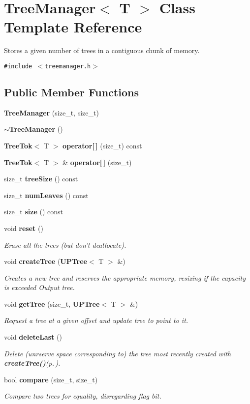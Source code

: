 \section{Tree\-Manager$<$ T $>$ Class Template Reference}
\label{classTreeManager}
Stores a given number of trees in a contiguous chunk of memory.  


{\tt \#include $<$treemanager.h$>$}

\subsection*{Public Member Functions}
\begin{CompactItemize}
\item 
{\bf Tree\-Manager} (size\_\-t, size\_\-t)
\item 
{\bf $\sim$Tree\-Manager} ()
\item 
{\bf Tree\-Tok}$<$ T $>$ {\bf operator[$\,$]} (size\_\-t) const 
\item 
{\bf Tree\-Tok}$<$ T $>$ \& {\bf operator[$\,$]} (size\_\-t)
\item 
size\_\-t {\bf tree\-Size} () const 
\item 
size\_\-t {\bf num\-Leaves} () const 
\item 
size\_\-t {\bf size} () const 
\item 
void {\bf reset} ()
\begin{CompactList}\small\item\em Erase all the trees (but don't deallocate). \item\end{CompactList}\item 
void {\bf create\-Tree} ({\bf UPTree}$<$ T $>$ \&)
\begin{CompactList}\small\item\em Creates a new tree and reserves the appropriate memory, resizing if the capacity is exceeded  Output tree. \item\end{CompactList}\item 
void {\bf get\-Tree} (size\_\-t, {\bf UPTree}$<$ T $>$ \&)
\begin{CompactList}\small\item\em Request a tree at a given offset and update tree to point to it. \item\end{CompactList}\item 
void {\bf delete\-Last} ()
\begin{CompactList}\small\item\em Delete (unrserve space corresponding to) the tree most recently created with {\bf create\-Tree()}{\rm (p.\,\pageref{classTreeManager_a8})}. \item\end{CompactList}\item 
bool {\bf compare} (size\_\-t, size\_\-t)
\begin{CompactList}\small\item\em Compare two trees for equality, disregarding flag bit. \item\end{CompactList}\end{CompactItemize}
